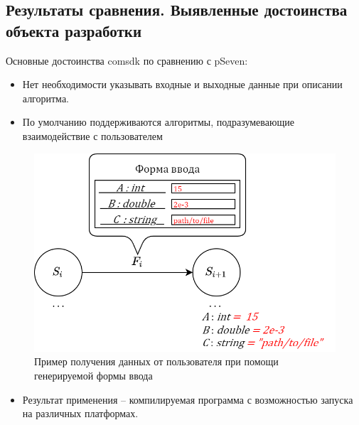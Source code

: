 \subsection{Результаты сравнения. Выявленные достоинства объекта разработки}
\begin{frame}
    Основные достоинства comsdk по сравнению с pSeven:
    \begin{itemize}
        \item Нет необходимости указывать входные и выходные данные при описании алгоритма.
        \item По умолчанию поддерживаются алгоритмы, подразумевающие взаимодействие с пользователем
    \end{itemize}

    \begin{figure}
        \centering
        \includegraphics[height=0.33\textheight]{images/illustration.form_generation.png}
        \caption{Пример получения данных от пользователя при помощи генерируемой формы ввода}
    \end{figure}

    \begin{itemize}
        \item Результат применения -- компилируемая программа с возможностью запуска на различных платформах.
    \end{itemize}
\end{frame}

